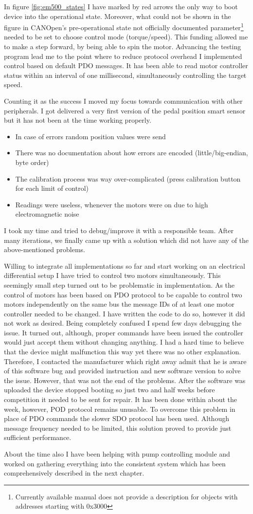 In figure \ref{fig:em500_states} I have marked by red arrows the only way to boot device into the operational state. Moreover, what could not be shown in the figure in CANOpen's pre-operational state not officially documented parameter\footnote{Currently available manual does not provide a description for objects with addresses starting with 0x3000} needed to be set to choose control mode (torque/speed). This funding allowed me to make a step forward, by being able to spin the motor.
Advancing the testing program lead me to the point where to reduce protocol overhead I implemented control based on default PDO messages. It has been able to read motor controller status within an interval of one millisecond, simultaneously controlling the target speed.

Counting it as the success I moved my focus towards communication with other peripherals. I got delivered a very first version of the pedal position smart sensor but it has not been at the time working properly.
\begin{itemize}
    \item In case of errors random position values were send
    \item There was no documentation about how errors are encoded (little/big-endian, byte order)
    \item The calibration process was way over-complicated (press calibration button for each limit of control)
    \item Readings were useless, whenever the motors were on due to high electromagnetic noise
\end{itemize} 
I took my time and tried to debug/improve it with a responsible team. After many iterations, we finally came up with a solution which did not have any of the above-mentioned problems.

Willing to integrate all implementations so far and start working on an electrical differential setup I have tried to control two motors simultaneously. This seemingly small step turned out to be problematic in implementation.
As the control of motors has been based on PDO protocol to be capable to control two motors independently on the same bus the message IDs of at least one motor controller needed to be changed. I have written the code to do so, however it did not work as desired. Being completely confused I spend few days debugging the issue. 
It turned out, although, proper commands have been issued the controller would just accept them without changing anything. I had a hard time to believe that the device might malfunction this way yet there was no other explanation. Therefore, I contacted the manufacturer which right away admit that he is aware of this software bug and provided instruction and new software version to solve the issue. However, that was not the end of the problems.
After the software was uploaded the device stopped booting so just two and half weeks before competition it needed to be sent for repair. It has been done within about the week, however, POD protocol remains unusable.
To overcome this problem in place of PDO commands the slower SDO protocol has been used. Although message frequency needed to be limited, this solution proved to provide just sufficient performance.

About the time also I have been helping with pump controlling module and worked on gathering everything into the consistent system which has been comprehensively described in the next chapter.